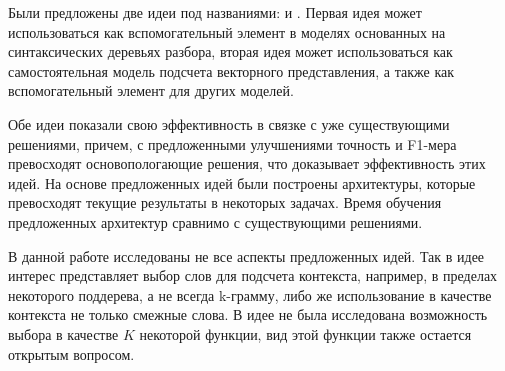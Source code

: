 Были предложены две идеи под названиями:  и .
Первая идея может использоваться как вспомогательный элемент в моделях основанных на синтаксических деревьях разбора, вторая идея может использоваться как самостоятельная модель подсчета векторного представления, а также как вспомогательный элемент для других моделей.

Обе идеи показали свою эффективность в связке с уже существующими решениями, причем, с предложенными улучшениями точность и F1-мера превосходят основопологающие решения, что доказывает эффективность этих идей.
На основе предложенных идей были построены архитектуры, которые превосходят текущие результаты в некоторых задачах. Время обучения предложенных архитектур сравнимо с существующими решениями.

В данной работе исследованы не все аспекты предложенных идей. Так в идее  интерес представляет выбор слов для подсчета контекста, например, в пределах некоторого поддерева, а не всегда k-грамму, либо же использование в качестве контекста не только смежные слова.
В идее  не была исследована возможность выбора в качестве $K$ некоторой функции, вид этой функции также остается открытым вопросом.